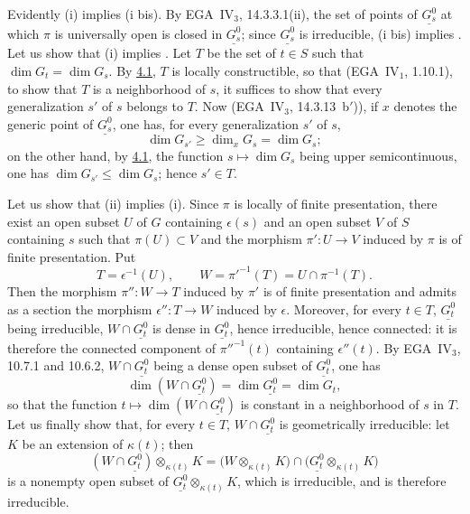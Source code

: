 Evidently \textup{(i)} implies \textup{(i bis)}. By EGA~IV\(_3\), 14.3.3.1(ii), the set
of points of \(\underline{G_s^0}\) at which \(\pi\) is universally open is
closed in \(\underline{G_s^0}\); since \(\underline{G_s^0}\) is irreducible,
\textup{(i bis)} implies \textup{}. Let us show that \textup{(i)} implies
\textup{}. Let \(T\) be the set of \(t\in S\) such that
\(\dim G_t=\dim G_s\). By \hyperref[prop:sga3-VIB-4.1]{4.1}, \(T\) is locally constructible, so
that (EGA~IV\(_1\), 1.10.1), to show that \(T\) is a neighborhood of \(s\), it
suffices to show that every generalization \(s'\) of \(s\) belongs to
\(T\). Now (EGA~IV\(_3\), 14.3.13~b\('\))), if \(x\) denotes the generic point of
\(\underline{G_s^0}\), one has, for every generalization \(s'\) of \(s\),
\[
  \dim G_{s'}\geq\dim_xG_s=\dim G_s;
\]
on the other hand, by \hyperref[prop:sga3-VIB-4.1]{4.1}, the function \(s\mapsto\dim G_s\) being upper
semicontinuous, one has \(\dim G_{s'}\leq\dim G_s\); hence \(s'\in T\).

Let us show that \textup{(ii)} implies \textup{(i)}. Since \(\pi\) is locally of finite presentation, there exist an open
subset \(U\) of \(G\) containing \(\epsilon(s)\) and an open subset \(V\) of
\(S\) containing \(s\) such that \(\pi(U)\subset V\) and the morphism
\(\pi':U\to V\) induced by \(\pi\) is of finite presentation. Put
\[
  T=\epsilon^{-1}(U),
  \qquad
  W={\pi'}^{-1}(T)=U\cap\pi^{-1}(T).
\]
Then the morphism \(\pi'':W\to T\) induced by \(\pi'\) is of finite
presentation and admits as a section the morphism \(\epsilon'':T\to W\)
induced by \(\epsilon\). Moreover, for every \(t\in T\), \(\underline{G_t^0}\)
being irreducible, \(W\cap\underline{G_t^0}\) is dense in
\(\underline{G_t^0}\), hence irreducible, hence connected: it is therefore
the connected component of \({\pi''}^{-1}(t)\) containing \(\epsilon''(t)\).
By EGA~IV\(_3\), 10.7.1 and 10.6.2, \(W\cap\underline{G_t^0}\) being a dense
open subset of \(\underline{G_t^0}\), one has
\[
  \dim(W\cap\underline{G_t^0})=\dim\underline{G_t^0}=\dim G_t,
\]
so that the function \(t\mapsto\dim(W\cap\underline{G_t^0})\) is constant in a
neighborhood of \(s\) in \(T\). Let us finally show that, for every
\(t\in T\), \(W\cap\underline{G_t^0}\) is geometrically irreducible: let \(K\)
be an extension of \(\kappa(t)\); then
\[
  (W\cap\underline{G_t^0})\otimes_{\kappa(t)}K
    =
  \bigl(W\otimes_{\kappa(t)}K\bigr)
    \cap
  \bigl(\underline{G_t^0}\otimes_{\kappa(t)}K\bigr)
\]
is a nonempty open subset of \(\underline{G_t^0}\otimes_{\kappa(t)}K\), which is
irreducible, and is therefore irreducible.

